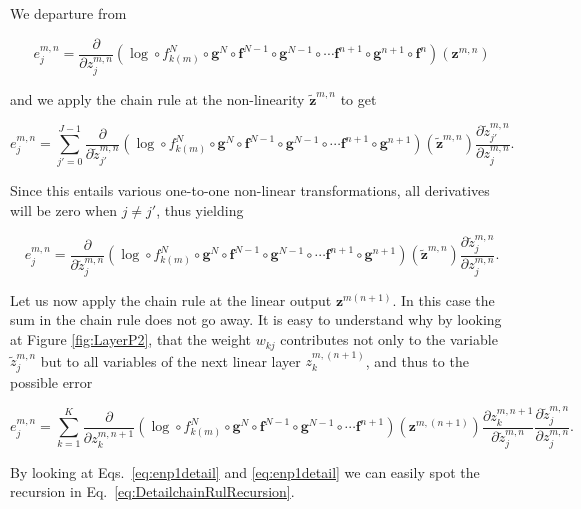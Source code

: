 \noindent We departure from

\begin{equation}
e^{m,n}_j = \frac{\partial}{\partial z^{m,n}_{j}} (\log \circ f_{k(m)}^N \circ \mathbf{g}^N \circ \mathbf{f}^{N-1} \circ \mathbf{g}^{N-1} \circ \cdots \mathbf{f}^{n+1} \circ \mathbf{g}^{n+1} \circ \mathbf{f}^{n})(\mathbf{z}^{m,n}) 
\end{equation}

\noindent and we apply the chain rule at the non-linearity $\tilde{\mathbf{z}}^{m,n}$ to get

\begin{equation}
e^{m,n}_j =  \sum_{j'=0}^{J-1}\frac{\partial}{\partial \tilde{z}^{m,n}_{j'}} (\log \circ f_{k(m)}^N \circ \mathbf{g}^N \circ \mathbf{f}^{N-1} \circ \mathbf{g}^{N-1} \circ \cdots \mathbf{f}^{n+1} \circ \mathbf{g}^{n+1})(\tilde{\mathbf{z}}^{m,n})\frac{\partial \tilde{z}^{m,n}_{j'}}{\partial z_{j}^{m,n}}.
\end{equation}

Since this entails various one-to-one non-linear transformations, all
derivatives will be zero when $j\neq j'$, thus yielding 

\begin{equation}
e^{m,n}_j =  \frac{\partial}{\partial \tilde{z}^{m,n}_{j}} (\log \circ f_{k(m)}^N \circ \mathbf{g}^N \circ \mathbf{f}^{N-1} \circ \mathbf{g}^{N-1} \circ \cdots \mathbf{f}^{n+1} \circ \mathbf{g}^{n+1})(\tilde{\mathbf{z}}^{m,n})\frac{\partial \tilde{z}^{m,n}_{j}}{\partial z_{j}^{m,n}}.
\end{equation}

Let us now apply the chain rule at the linear output $\mathbf{z}^{m(n+1)}$. In this case the sum in the chain rule does not go away. It is easy to
understand why by looking at Figure \ref{fig:LayerP2}, that the weight $w_{kj}$
contributes not only to the variable $\tilde{z}^{m,n}_j$ but to all variables of the
next linear layer $z^{m,(n+1)}_k$, and thus to the possible error

\begin{equation}
e^{m,n}_j = \sum_{k=1}^K \frac{\partial}{\partial z^{m,n+1}_{k}} (\log \circ f_{k(m)}^N \circ \mathbf{g}^N \circ \mathbf{f}^{N-1} \circ \mathbf{g}^{N-1} \circ \cdots \mathbf{f}^{n+1})(\mathbf{z}^{m,(n+1)})\frac{\partial z^{m,n+1}_k}{\partial \tilde{z}_{j}^{m,n}}\frac{\partial \tilde{z}^{m,n}_{j}}{\partial z_{j}^{m,n}}.
\label{eq:partialfn4}
\end{equation}

\noindent By looking at Eqs.~\ref{eq:enp1detail} and \ref{eq:enp1detail} we can easily
spot the recursion in Eq.~\ref{eq:DetailchainRulRecursion}.  



